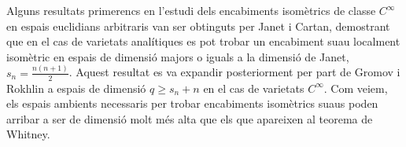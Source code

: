 Alguns resultats primerencs en l'estudi dels encabiments isomètrics de classe $C^\infty$ en espais euclidians arbitraris van ser obtinguts per Janet i Cartan, demostrant que en el cas de varietats analítiques es pot trobar un encabiment suau localment isomètric en espais de dimensió majors o iguals a la dimensió de Janet, $s_n = \frac{n(n+1)}{2}$. Aquest resultat es va expandir posteriorment per part de Gromov i Rokhlin a espais de dimensió $q\ge s_n+n$ en el cas de varietats $C^\infty$. Com veiem, els espais ambients necessaris per trobar encabiments isomètrics suaus poden arribar a ser de dimensió molt més alta que els que apareixen al teorema de Whitney.











